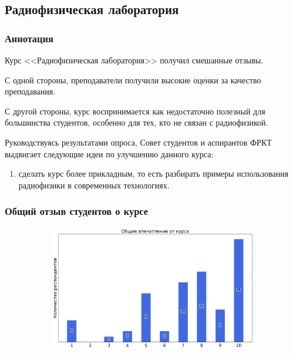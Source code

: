 \subsection{Радиофизическая лаборатория}
	
	\subsubsection{Аннотация}

		Курс <<Радиофизическая лаборатория>> получил смешанные отзывы. 
		
		С одной стороны, преподаватели получили высокие оценки за качество преподавания. 
		
		С другой стороны, курс воспринимается как недостаточно полезный для большинства студентов, особенно для тех, кто не связан с радиофизикой.

		Руководствуясь результатами опроса, Совет студентов и аспирантов ФРКТ выдвигает следующие идеи по улучшению данного курса:
		\begin{enumerate}
			\item сделать курс более прикладным, то есть разбирать примеры использования радиофизики в современных технологиях.
		\end{enumerate}

	\subsubsection{Общий отзыв студентов о курсе}

		\begin{figure}[H]
			\centering
			\begin{subfigure}[b]{0.45\textwidth}
				\centering
				\includegraphics[width=\textwidth]{images/3 course/Радиофизическая лаборатория/general-0.png}
			\end{subfigure}
		\end{figure}

